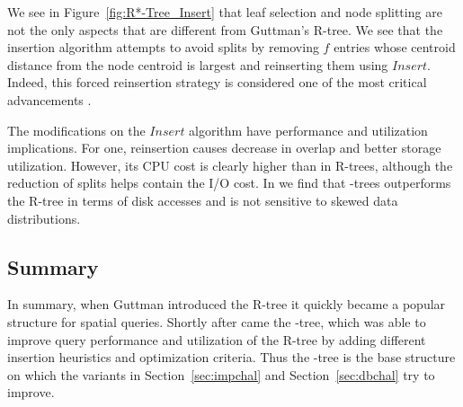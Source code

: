 We see in Figure~\ref{fig:R*-Tree_Insert} that leaf selection and node splitting are not
the only aspects that are different from Guttman's R-tree. We see that the insertion 
algorithm attempts to avoid splits by removing $f$ entries whose centroid distance from 
the node centroid is largest and reinserting them using $Insert$. 
Indeed, this forced reinsertion strategy is considered one of the most critical advancements \cite{beckmannseeger09,gaedegunther98,schrekchen00}.
 
The modifications on the $Insert$ algorithm have performance and utilization implications. 
For one, reinsertion causes decrease in overlap and better storage utilization. However,
its CPU cost is clearly higher than in R-trees, although the reduction of splits helps 
contain the I/O cost. In \cite{beckmannkriegelschneiderseeger90} we find that \rstar-trees 
outperforms the R-tree in terms of disk accesses and is not sensitive to skewed data distributions. 

\subsection{Summary}
In summary, when Guttman introduced the R-tree it quickly became a popular structure
for spatial queries. Shortly after came the \rstar-tree, which was able to improve query 
performance and utilization of the R-tree by adding different insertion heuristics and 
optimization criteria. Thus the \rstar-tree is the base structure on which the variants 
in Section~\ref{sec:impchal} and Section~\ref{sec:dbchal} try to improve.
